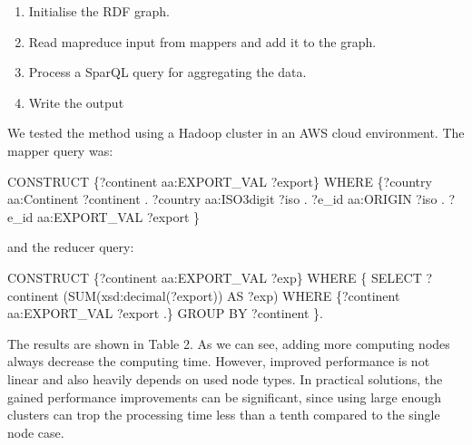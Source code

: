 \documentclass[USenglish,twocolumn]{article}
\begin{document}
\begin{enumerate}
\def\labelenumi{\arabic{enumi}.}
\item
  Initialise the RDF graph.
\item
  Read mapreduce input from mappers and add it to the graph.
\item
  Process a SparQL query for aggregating the data.
\item
  Write the output
\end{enumerate}

We tested the method using a Hadoop cluster in an AWS cloud environment.
The mapper query was:

CONSTRUCT \{?continent aa:EXPORT\_VAL ?export\} WHERE \{?country
aa:Continent ?continent . ?country aa:ISO3digit ?iso . ?e\_id aa:ORIGIN
?iso . ?e\_id aa:EXPORT\_VAL ?export \}

and the reducer query:

CONSTRUCT \{?continent aa:EXPORT\_VAL ?exp\} WHERE \{ SELECT ?continent
(SUM(xsd:decimal(?export)) AS ?exp) WHERE \{?continent aa:EXPORT\_VAL
?export .\} GROUP BY ?continent \}.

The results are shown in Table 2. As we can see, adding more computing
nodes always decrease the computing time. However, improved performance
is not linear and also heavily depends on used node types. In practical
solutions, the gained performance improvements can be significant, since
using large enough clusters can trop the processing time less than a
tenth compared to the single node case.
\end{document}
